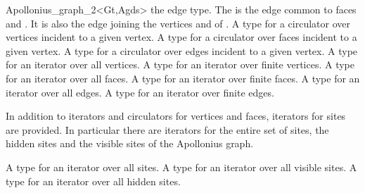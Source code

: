 \begin{ccRefClass}{Apollonius_graph_2<Gt,Agds>}
%
 {the edge type.
The  is the edge common to faces  and 
. It is also the edge joining the vertices
 and  of .
}
%
{}
%
\ccGlue
{}
\ccGlue
{}
\ccGlue
{}
{A type for a circulator over vertices incident to a given vertex.}
\ccGlue
{}
{A type for a circulator over faces incident to a given vertex.}
\ccGlue
{}
{A type for a circulator over edges incident to a given vertex.}
\ccGlue
{}
{A type for an iterator over all vertices.}
\ccGlue
{}
{A type for an iterator over finite vertices.}
\ccGlue
{}
{A type for an iterator over all faces.}
\ccGlue
{}
{A type for an iterator over finite faces.}
\ccGlue
{}
{A type for an iterator over all edges.}
\ccGlue
{}
{A type for an iterator over finite edges.}


In addition to iterators and circulators for vertices and faces,
iterators for sites are provided. In particular there are iterators
for the entire set of sites, the hidden sites and the visible sites of
the Apollonius graph.


\ccGlue
{}
{A type for an iterator over all sites.}
\ccGlue
{}
{A type for an iterator over all visible sites.}
\ccGlue
{}
{A type for an iterator over all hidden sites.}



\end{ccRefClass}
